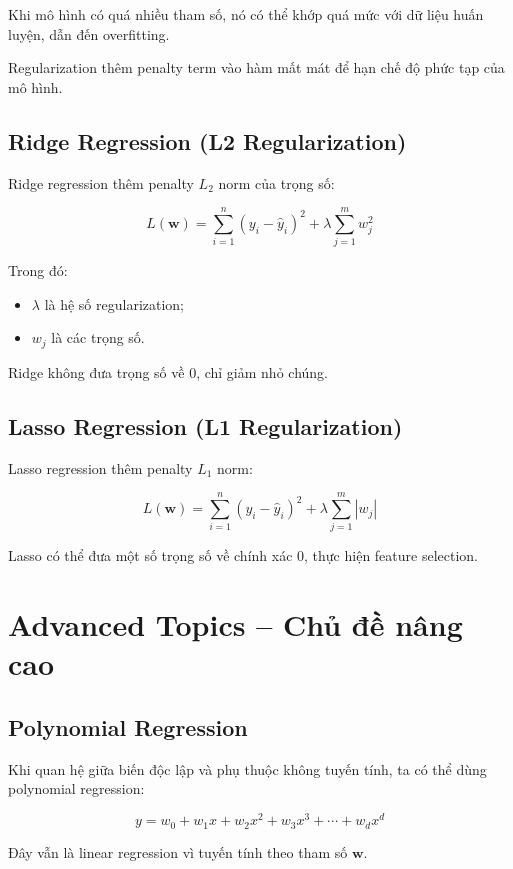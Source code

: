 Khi mô hình có quá nhiều tham số, nó có thể khớp quá mức với dữ liệu huấn luyện, dẫn đến overfitting.

Regularization thêm penalty term vào hàm mất mát để hạn chế độ phức tạp của mô hình.

\subsection{Ridge Regression (L2 Regularization)}

Ridge regression thêm penalty $L_2$ norm của trọng số:

\[
    L(\mathbf{w}) = \sum_{i=1}^{n}(y_i - \hat{y}_i)^2 + \lambda \sum_{j=1}^{m}w_j^2
\]

Trong đó:
\begin{itemize}
    \item $\lambda$ là hệ số regularization;
    \item $w_j$ là các trọng số.
\end{itemize}

Ridge không đưa trọng số về 0, chỉ giảm nhỏ chúng.

\subsection{Lasso Regression (L1 Regularization)}

Lasso regression thêm penalty $L_1$ norm:

\[
    L(\mathbf{w}) = \sum_{i=1}^{n}(y_i - \hat{y}_i)^2 + \lambda \sum_{j=1}^{m}|w_j|
\]

Lasso có thể đưa một số trọng số về chính xác 0, thực hiện feature selection.

\section{Advanced Topics -- Chủ đề nâng cao}

\subsection{Polynomial Regression}

Khi quan hệ giữa biến độc lập và phụ thuộc không tuyến tính, ta có thể dùng polynomial regression:

\[
    y = w_0 + w_1x + w_2x^2 + w_3x^3 + \cdots + w_dx^d
\]

Đây vẫn là linear regression vì tuyến tính theo tham số $\mathbf{w}$.

